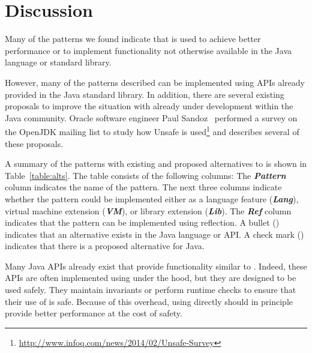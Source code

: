 \section{Discussion}
\label{sec:unsafe:discussion}

Many of the patterns we found indicate that \unsafe{} is used to achieve 
better performance or to implement functionality not otherwise available in the
Java language or standard library.

However, many of the patterns described can be implemented using APIs
already provided in the Java standard library. 
In addition, there are several existing proposals to improve the situation
with \unsafe{} already under development within the Java community.
Oracle software engineer Paul Sandoz~\cite{psandoz14} performed a survey on
the OpenJDK mailing list to
study how Unsafe is
used\footnote{\url{http://www.infoq.com/news/2014/02/Unsafe-Survey}} and
describes several of these proposals.



A summary of the patterns with existing and proposed alternatives to \unsafe{} is shown in Table~\ref{table:alts}.
The table consists of the following columns:
The \textbf{\em Pattern} column indicates the name of the pattern.
The next three columns indicate whether the pattern could be implemented either as a
language feature (\textbf{\em Lang}),
virtual machine extension (\textbf{\em VM}),
or
library extension (\textbf{\em Lib}).
The \textbf{\em Ref} column indicates that the pattern can be
implemented using reflection.
A bullet (\exis) indicates that an
alternative exists in the Java language or API. A check mark (\tick)
indicates that there is a proposed alternative for Java.


Many Java APIs already exist that provide functionality similar to \unsafe{}.
Indeed, these APIs are often implemented using \unsafe{} under the hood, but 
they are designed to be used safely.
They maintain invariants or perform runtime checks
to ensure that their use of \unsafe{} is safe.
Because of this overhead, using \unsafe{}
directly should in principle provide better performance at the cost of safety.

